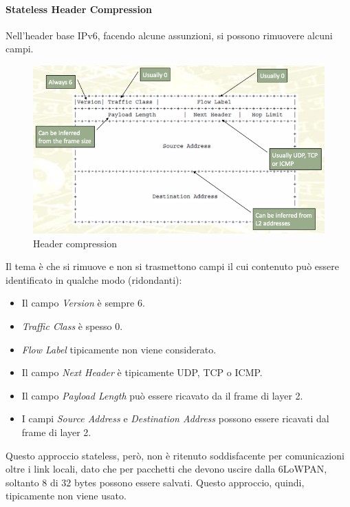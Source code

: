 \documentclass{article}
\begin{document}
\paragraph{Stateless Header Compression}
Nell'header base IPv6, facendo alcune assunzioni, si possono rimuovere alcuni campi.
\begin{figure}[H]
\centering
\includegraphics[scale=0.4]{figures/header compression.png}
\caption{Header compression}
\end{figure}
Il tema è che si rimuove e non si trasmettono campi il cui contenuto può essere identificato in qualche modo (ridondanti):
\begin{itemize}
    \item Il campo \textit{Version} è sempre 6.
    \item \textit{Traffic Class} è spesso 0.
    \item \textit{Flow Label} tipicamente non viene considerato.
    \item Il campo \textit{Next Header} è tipicamente UDP, TCP o ICMP.
    \item Il campo \textit{Payload Length} può essere ricavato da il frame di layer 2.
    \item I campi \textit{Source Address} e \textit{Destination Address} possono essere ricavati dal frame di layer 2.
\end{itemize}
Questo approccio stateless, però, non è ritenuto soddisfacente per comunicazioni oltre i link locali, dato che per pacchetti che devono uscire dalla 6LoWPAN, soltanto 8 di 32 bytes possono essere salvati. Questo approccio, quindi, tipicamente non viene usato.
\end{document}
